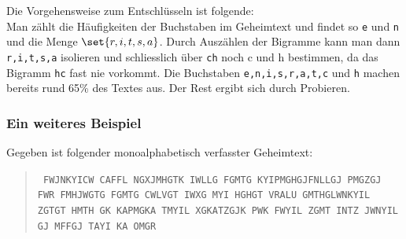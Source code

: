 \documentclass[%
11pt,%
twoside,%
titlepage,%
german,%
headsepline%
]{scrartcl}
\begin{document}
Die
Vorgehensweise zum Entschlüsseln ist folgende:\\
Man zählt die Häufigkeiten der Buchstaben im Geheimtext und findet so \texttt{e} und \texttt{n} und die Menge $\set{r,i,t,s,a}$. Durch Auszählen der Bigramme kann man dann \texttt{r,i,t,s,a} isolieren und schliesslich über \texttt{ch} noch c und h bestimmen, da das Bigramm \texttt{hc} fast nie vorkommt. Die Buchstaben \texttt{e,n,i,s,r,a,t,c} und \texttt{h} machen bereits rund 65\% des Textes aus. Der Rest ergibt sich durch Probieren.

\subsubsection{Ein weiteres Beispiel}

Gegeben ist folgender monoalphabetisch verfasster Geheimtext:
\begin{quote}
\noindent
\texttt{
FWJNKYICW CAFFL NGXJMHGTK IWLLG FGMTG KYIPMGHGJFNLLGJ PMGZGJ FWR FMHJWGTG FGMTG CWLVGT IWXG MYI HGHGT VRALU GMTHGLWNKYIL ZGTGT HMTH GK KAPMGKA TMYIL XGKATZGJK PWK FWYIL ZGMT INTZ JWNYIL GJ MFFGJ TAYI KA OMGR
\normalfont
}
\end{quote}
\end{document}
